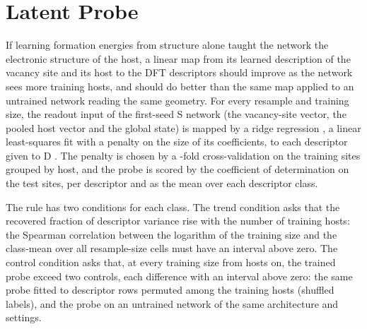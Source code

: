\section{Latent Probe}
\label{app:probe}

If learning formation energies from structure alone taught the network the electronic structure of the host, a linear map from its learned description of the vacancy site and its host to the DFT descriptors should improve as the network sees more training hosts, and should do better than the same map applied to an untrained network reading the same geometry. For every resample and training size, the readout input of the first-seed S network (the vacancy-site vector, the pooled host vector and the global state) is mapped by a ridge regression \citep{Pedregosa2018scikitlearn}, a linear least-squares fit with a penalty on the size of its coefficients, to each descriptor given to D \citep{Alain2018understanding}. The penalty is chosen by a \numCfgProbeAlphaCvFolds{}-fold cross-validation on the training sites grouped by host, and the probe is scored by the coefficient of determination \Rsq{} on the test sites, per descriptor and as the mean over each descriptor class.

The rule has two conditions for each class. The trend condition asks that the recovered fraction of descriptor variance rise with the number of training hosts: the Spearman correlation between the logarithm of the training size and the class-mean \Rsq{} over all \numProbeDescriptiveSVTwoHostRuleTrendNCells{} resample-size cells must have an interval above zero. The control condition asks that, at every training size from \numCfgProbePassRuleBeatsControlsMinBudget{} hosts on, the trained probe exceed two controls, each difference with an interval above zero: the same probe fitted to descriptor rows permuted among the training hosts (shuffled labels), and the probe on an untrained network of the same architecture and settings.

